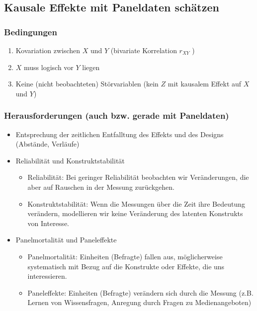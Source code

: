 \documentclass[]{book}
\providecommand{\tightlist}{%
  \setlength{\itemsep}{0pt}\setlength{\parskip}{0pt}}
\begin{document}
\hypertarget{kausale-effekte-mit-paneldaten-schuxe4tzen}{%
\subsection*{Kausale Effekte mit Paneldaten schätzen}\label{kausale-effekte-mit-paneldaten-schuxe4tzen}}

\hypertarget{bedingungen}{%
\subsubsection*{Bedingungen}\label{bedingungen}}

\begin{enumerate}
\def\labelenumi{\arabic{enumi}.}
\tightlist
\item
  Kovariation zwischen \(X\) und \(Y\) (bivariate Korrelation \(r_{XY}\) )
\item
  \(X\) muss logisch vor \(Y\) liegen
\item
  Keine (nicht beobachteten) Störvariablen (kein \(Z\) mit kausalem Effekt auf \(X\) und \(Y\))
\end{enumerate}

\hypertarget{herausforderungen-auch-bzw.-gerade-mit-paneldaten}{%
\subsubsection*{Herausforderungen (auch bzw. gerade mit Paneldaten)}\label{herausforderungen-auch-bzw.-gerade-mit-paneldaten}}

\begin{itemize}
\tightlist
\item
  Entsprechung der zeitlichen Entfalltung des Effekts und des Designs (Abstände, Verläufe)
\item
  Reliabilität und Konstruktstabilität

  \begin{itemize}
  \tightlist
  \item
    Reliabilität: Bei geringer Reliabilität beobachten wir Veränderungen, die aber auf Rauschen in der Messung zurückgehen.
  \item
    Konstruktstabilität: Wenn die Messungen über die Zeit ihre Bedeutung verändern, modellieren wir keine Veränderung des latenten Konstrukts von Interesse.
  \end{itemize}
\item
  Panelmortalität und Paneleffekte

  \begin{itemize}
  \tightlist
  \item
    Panelmortalität: Einheiten (Befragte) fallen aus, möglicherweise systematisch mit Bezug auf die Konstrukte oder Effekte, die uns interessieren.
  \item
    Paneleffekte: Einheiten (Befragte) verändern sich durch die Messung (z.B. Lernen von Wissensfragen, Anregung durch Fragen zu Medienangeboten)
  \end{itemize}
\end{itemize}
\end{document}
